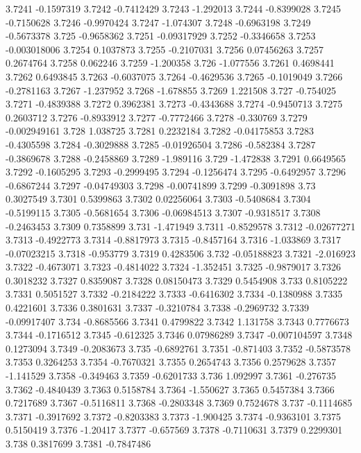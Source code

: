 3.7241  -0.1597319
3.7242  -0.7412429
3.7243  -1.292013
3.7244  -0.8399028
3.7245  -0.7150628
3.7246  -0.9970424
3.7247  -1.074307
3.7248  -0.6963198
3.7249  -0.5673378
3.725  -0.9658362
3.7251  -0.09317929
3.7252  -0.3346658
3.7253  -0.003018006
3.7254  0.1037873
3.7255  -0.2107031
3.7256  0.07456263
3.7257  0.2674764
3.7258  0.062246
3.7259  -1.200358
3.726  -1.077556
3.7261  0.4698441
3.7262  0.6493845
3.7263  -0.6037075
3.7264  -0.4629536
3.7265  -0.1019049
3.7266  -0.2781163
3.7267  -1.237952
3.7268  -1.678855
3.7269  1.221508
3.727  -0.754025
3.7271  -0.4839388
3.7272  0.3962381
3.7273  -0.4343688
3.7274  -0.9450713
3.7275  0.2603712
3.7276  -0.8933912
3.7277  -0.7772466
3.7278  -0.330769
3.7279  -0.002949161
3.728  1.038725
3.7281  0.2232184
3.7282  -0.04175853
3.7283  -0.4305598
3.7284  -0.3029888
3.7285  -0.01926504
3.7286  -0.582384
3.7287  -0.3869678
3.7288  -0.2458869
3.7289  -1.989116
3.729  -1.472838
3.7291  0.6649565
3.7292  -0.1605295
3.7293  -0.2999495
3.7294  -0.1256474
3.7295  -0.6492957
3.7296  -0.6867244
3.7297  -0.04749303
3.7298  -0.00741899
3.7299  -0.3091898
3.73  0.3027549
3.7301  0.5399863
3.7302  0.02256064
3.7303  -0.5408684
3.7304  -0.5199115
3.7305  -0.5681654
3.7306  -0.06984513
3.7307  -0.9318517
3.7308  -0.2463453
3.7309  0.7358899
3.731  -1.471949
3.7311  -0.8529578
3.7312  -0.02677271
3.7313  -0.4922773
3.7314  -0.8817973
3.7315  -0.8457164
3.7316  -1.033869
3.7317  -0.07023215
3.7318  -0.953779
3.7319  0.4283506
3.732  -0.05188823
3.7321  -2.016923
3.7322  -0.4673071
3.7323  -0.4814022
3.7324  -1.352451
3.7325  -0.9879017
3.7326  0.3018232
3.7327  0.8359087
3.7328  0.08150473
3.7329  0.5454908
3.733  0.8105222
3.7331  0.5051527
3.7332  -0.2184222
3.7333  -0.6416302
3.7334  -0.1380988
3.7335  0.4221601
3.7336  0.3801631
3.7337  -0.3210784
3.7338  -0.2969732
3.7339  -0.09917407
3.734  -0.8685566
3.7341  0.4799822
3.7342  1.131758
3.7343  0.7776673
3.7344  -0.1716512
3.7345  -0.612325
3.7346  0.07986289
3.7347  -0.007104597
3.7348  0.1273094
3.7349  -0.2083673
3.735  -0.6892761
3.7351  -0.871403
3.7352  -0.5873578
3.7353  0.3264253
3.7354  -0.7670321
3.7355  0.2654743
3.7356  0.2579628
3.7357  -1.141529
3.7358  -0.349463
3.7359  -0.6201733
3.736  1.092997
3.7361  -0.276735
3.7362  -0.4840439
3.7363  0.5158784
3.7364  -1.550627
3.7365  0.5457384
3.7366  0.7217689
3.7367  -0.5116811
3.7368  -0.2803348
3.7369  0.7524678
3.737  -0.1114685
3.7371  -0.3917692
3.7372  -0.8203383
3.7373  -1.900425
3.7374  -0.9363101
3.7375  0.5150419
3.7376  -1.20417
3.7377  -0.657569
3.7378  -0.7110631
3.7379  0.2299301
3.738  0.3817699
3.7381  -0.7847486
